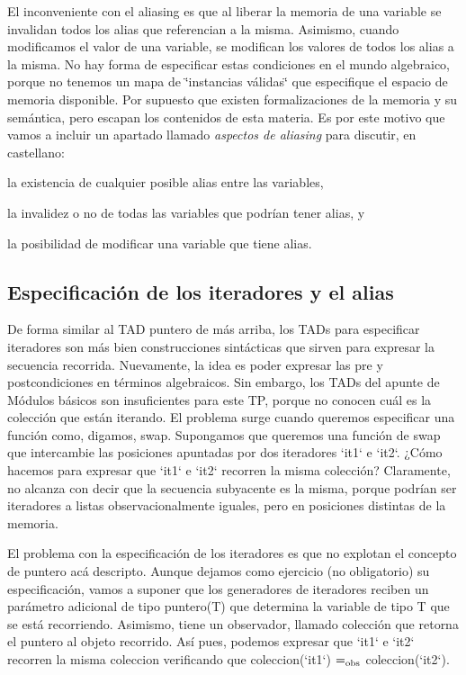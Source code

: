 \-El inconveniente con el aliasing es que al liberar la memoria de una variable se invalidan todos los alias que referencian a la misma. \-Asimismo, cuando modificamos el valor de una variable, se modifican los valores de todos los alias a la misma. \-No hay forma de especificar estas condiciones en el mundo algebraico, porque no tenemos un mapa de \char`\"{}instancias válidas\char`\"{} que especifique el espacio de memoria disponible. \-Por supuesto que existen formalizaciones de la memoria y su semántica, pero escapan los contenidos de esta materia. \-Es por este motivo que vamos a incluir un apartado llamado {\itshape aspectos de aliasing\/} para discutir, en castellano\-:
\begin{DoxyItemize}
\item la existencia de cualquier posible alias entre las variables,
\item la invalidez o no de todas las variables que podrían tener alias, y
\item la posibilidad de modificar una variable que tiene alias.
\end{DoxyItemize}\hypertarget{Aliasing_sec-iteradores}{}\subsection{\-Especificación de los iteradores y el alias}\label{Aliasing_sec-iteradores}
\-De forma similar al \-T\-A\-D puntero de más arriba, los \-T\-A\-Ds para especificar iteradores son más bien construcciones sintácticas que sirven para expresar la secuencia recorrida. \-Nuevamente, la idea es poder expresar las pre y postcondiciones en términos algebraicos. \-Sin embargo, los \-T\-A\-Ds del apunte de \-Módulos básicos son insuficientes para este \-T\-P, porque no conocen cuál es la colección que están iterando. \-El problema surge cuando queremos especificar una función como, digamos, swap. \-Supongamos que queremos una función de swap que intercambie las posiciones apuntadas por dos iteradores `it1` e `it2`. ¿\-Cómo hacemos para expresar que `it1` e `it2` recorren la misma colección? \-Claramente, no alcanza con decir que la secuencia subyacente es la misma, porque podrían ser iteradores a listas observacionalmente iguales, pero en posiciones distintas de la memoria.

\-El problema con la especificación de los iteradores es que no explotan el concepto de puntero acá descripto. \-Aunque dejamos como ejercicio (no obligatorio) su especificación, vamos a suponer que los generadores de iteradores reciben un parámetro adicional de tipo puntero(\-T) que determina la variable de tipo \-T que se está recorriendo. \-Asimismo, tiene un observador, llamado colección que retorna el puntero al objeto recorrido. \-Así pues, podemos expresar que `it1` e `it2` recorren la misma coleccion verificando que coleccion(`it1`) $=_{\rm obs}$ coleccion(`it2`). 